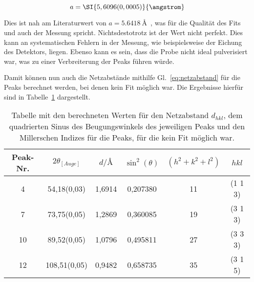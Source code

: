 \begin{equation}
    a = \SI{5,6096(0,0005)}{\angstrom}
\end{equation}

Dies ist nah am Literaturwert von $a = \SI[]{5,6418}[]{\angstrom}$~\cite{fon}, was für die Qualität des Fits und auch der Messung spricht. Nichtsdestotrotz ist der Wert nicht perfekt. Dies kann an systematischen Fehlern in der Messung, wie beispielsweise der Eichung des Detektors, liegen. Ebenso kann es sein, dass die Probe nicht ideal pulverisiert war, was zu einer Verbreiterung der Peaks führen würde.

Damit können nun auch die Netzabstände mithilfe Gl.~\ref{eq:netzabstand} für die Peaks berechnet werden, bei denen kein Fit möglich war. Die Ergebnisse hierfür sind in Tabelle~\ref{tab:gitter2} dargestellt.

\begin{table}[h!]
    \centering
     \begin{tabular}{|c|c|c|c|c|c|} 
     \hline
     Peak-Nr. & $2\theta_{[Auge]}$ & $d/\si{\angstrom}$ & $\sin^2(\theta)$ & $(h^2+k^2+l^2)$&  $h k l $ \\ [0.5ex] 
     \hline\hline
     4 & \num{54,18(0,03)} & 1,6914 & 0,207380 & 11 & (1 1 3) \\
     7 & \num{73,75(0,05)} & 1,2869 & 0,360085 & 19 & (3 1 3)\\
     10 & \num{89,52(0,05)}  & 1,0796 & 0,495811 & 27 & (3 3 3) \\
     12 & \num{108,51(0,05)} & 0,9482 & 0,658735 & 35 & (3 1 5) \\
     [1ex] 
     \hline
     \end{tabular}
     \caption[short]{Tabelle mit den berechneten Werten für den Netzabstand $d_{hkl}$, dem quadrierten Sinus des Beugungswinkels des jeweiligen Peaks und den Millerschen Indizes für die Peaks, für die kein Fit möglich war.}
     \label{tab:gitter2}
\end{table}
